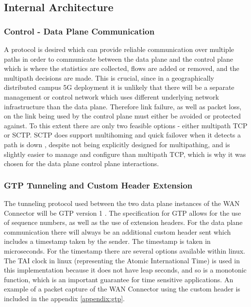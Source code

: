 \subsection{Internal Architecture}

\subsubsection{Control - Data Plane Communication}

A protocol is desired which can provide reliable communication over multiple paths in order to communicate between the data plane and the control plane which is where the statistics are collected, flows are added or removed, and the multipath decisions are made. This is crucial, since in a geographically distributed campus 5G deployment it is unlikely that there will be a separate management or control network which uses different underlying network infrastructure than the data plane. Therefore link failure, as well as packet loss, on the link being used by the control plane must either be avoided or protected against. To this extent there are only two feasible options - either multipath TCP or SCTP. SCTP does support multihoming and quick failover when it detects a path is down \cite{sctp-spec, sctp-failover}, despite not being explicitly designed for multipathing, and is slightly easier to manage and configure than multipath TCP, which is why it was chosen for the data plane control plane interactions.

\subsubsection{GTP Tunneling and Custom Header Extension}

The tunneling protocol used between the two data plane instances of the WAN Connector will  be GTP version 1 \cite{3gpp.29.060}. The specification for GTP allows for the use of sequence numbers, as well as the use of extension headers. For the data plane communication there will always be an additional custom header sent which includes a timestamp taken by the sender. The timestamp is taken in microseconds. For the timestamp there are several options available within linux. The TAI clock in linux (representing the Atomic International Time) is used in this implementation because it does not have leap seconds, and so is a monotonic function, which is an important guarantee for time sensitive applications. An example of a packet capture of the WAN Connector using the custom header is included in the appendix \ref{appendix:gtp}.


